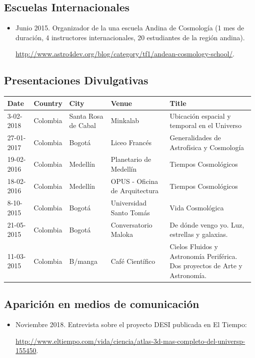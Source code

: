 \documentclass{article}
\begin{document}
\subsection{Escuelas Internacionales}
\begin{itemize}
\item {Junio 2015. Organizador de la una escuela Andina de
  Cosmolog\'ia (1 mes de duraci\'on, 4 instructores internacionales,
  20 estudiantes de la regi\'on andina). 

\url{http://www.astro4dev.org/blog/category/tf1/andean-cosmology-school/}. }
\end{itemize}

\subsection{Presentaciones Divulgativas}

\begin{tabular}{p{1.7cm} p{1.2cm} p{2.0cm} p{5.0cm} p{4.5cm}}\hline
Date & Country & City& Venue& Title\\\hline

3-02-2018 & Colombia & Santa Rosa de Cabal & Minkalab & Ubicaci\'on
espacial y temporal en el Universo\\
27-01-2017 & Colombia & Bogot\'a & Liceo Franc\'es & Generalidades de Astrof\'isica y Cosmolog\'ia\\
19-02-2016 & Colombia & Medell\'in & Planetario de Medell\'in & Tiempos Cosmol\'ogicos\\
18-02-2016 & Colombia & Medell\'in & OPUS - Oficina de Arquitectura & Tiempos Cosmol\'ogicos\\
8-10-2015  & Colombia & Bogot\'a & Universidad Santo Tom\'as & Vida Cosmol\'ogica \\
21-05-2015 & Colombia & Bogot\'a & Conversatorio Maloka & De d\'onde vengo yo. Luz, estrellas y galaxias.\\
11-03-2015 & Colombia & B/manga & Caf\'e Cient\'ifico & Cielos Fluidos y Astronom\'ia Perif\'erica. Dos proyectos de Arte y Astronom\'ia.\\\hline
\end{tabular}

\subsection{Aparici\'on en medios de comunicaci\'on}

\begin{itemize}
\item Noviembre 2018. Entrevista sobre el proyecto DESI publicada en El Tiempo:

 \url{http://www.eltiempo.com/vida/ciencia/atlas-3d-mas-completo-del-universp-155450}.
\end{itemize}
\end{document}
